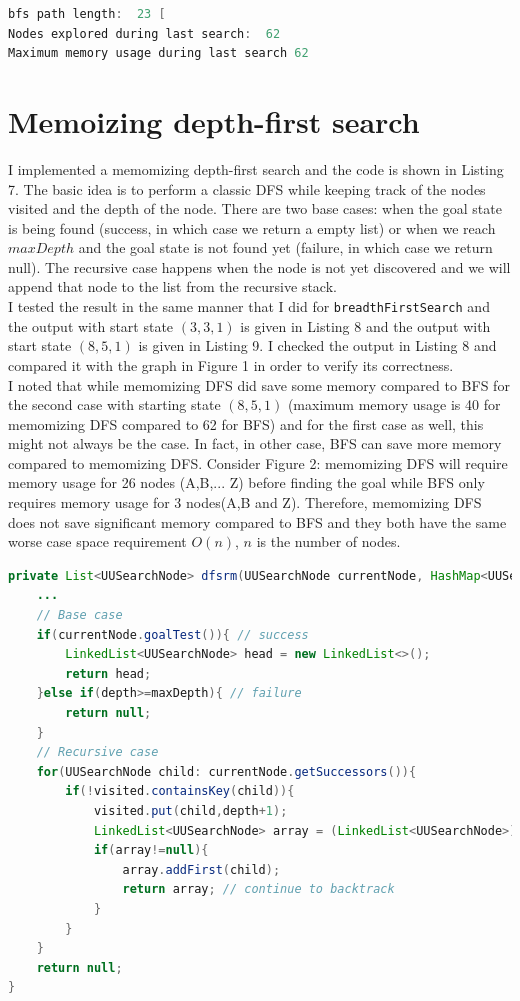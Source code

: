 \documentclass[9.5pt]{extarticle}
\begin{document}
\begin{lstlisting}[language=java,caption={Output for BFS for start state of (8, 5, 1)}]
bfs path length:  23 [
Nodes explored during last search:  62
Maximum memory usage during last search 62
\end{lstlisting}


\section{Memoizing depth-first search}

I implemented a memomizing depth-first search and the code is shown in Listing 7. The basic idea is to perform a classic DFS while keeping track of the nodes visited and the depth of the node. There are two base cases: when the goal state is being found (success, in which case we return a empty list) or when we reach $maxDepth$ and the goal state is not found yet (failure, in which case we return null). The recursive case happens when the node is not yet discovered and we will append that node to the list from the recursive stack. \\

I tested the result in the same manner that I did for \verb`breadthFirstSearch` and the output with start state $(3,3,1)$ is given in Listing 8 and the output with start state $(8,5,1)$ is given in Listing 9. I checked the output in Listing 8 and compared it with the graph in Figure 1 in order to verify its correctness.\\

I noted that while memomizing DFS did save some memory compared to BFS for the second case with starting state $(8,5,1)$ (maximum memory usage is 40 for memomizing DFS compared to 62 for BFS) and for the first case as well, this might not always be the case. In fact, in other case, BFS can save more memory compared to memomizing DFS. Consider Figure 2: memomizing DFS will require memory usage for 26 nodes (A,B,... Z) before finding the goal while BFS only requires memory usage for 3 nodes(A,B and Z). Therefore, memomizing DFS does not save significant memory compared to BFS and they both have the same worse case space requirement $O(n)$, $n$ is the number of nodes.

\begin{lstlisting}[language=java,caption={Memomizing depth first search}]
private List<UUSearchNode> dfsrm(UUSearchNode currentNode, HashMap<UUSearchNode,Integer> visited, int depth, int maxDepth) {
	...
	// Base case
	if(currentNode.goalTest()){	// success
		LinkedList<UUSearchNode> head = new LinkedList<>();
		return head;
	}else if(depth>=maxDepth){ // failure
		return null;
	}
	// Recursive case
	for(UUSearchNode child: currentNode.getSuccessors()){
		if(!visited.containsKey(child)){
			visited.put(child,depth+1);
			LinkedList<UUSearchNode> array = (LinkedList<UUSearchNode>) dfsrm(child, visited,depth+1,maxDepth); // recursion
			if(array!=null){ 
				array.addFirst(child);
				return array; // continue to backtrack
			}
		}
	}
	return null;
}
\end{lstlisting}
\end{document}

